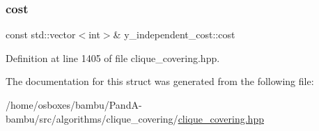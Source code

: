 \subsubsection{\texorpdfstring{cost}{cost}}
{\footnotesize\ttfamily const std\+::vector$<$int$>$\& y\+\_\+independent\+\_\+cost\+::cost\hspace{0.3cm}{\ttfamily [private]}}



Definition at line 1405 of file clique\+\_\+covering.\+hpp.



The documentation for this struct was generated from the following file\+:\begin{DoxyCompactItemize}
\item 
/home/osboxes/bambu/\+Pand\+A-\/bambu/src/algorithms/clique\+\_\+covering/\hyperlink{clique__covering_8hpp}{clique\+\_\+covering.\+hpp}\end{DoxyCompactItemize}
